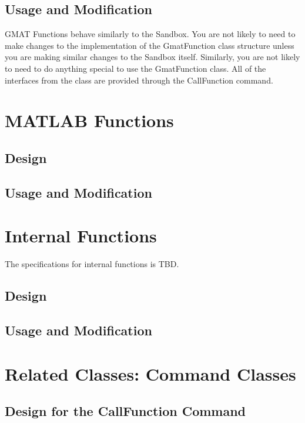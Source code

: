\subsection{Usage and Modification}

GMAT Functions behave similarly to the Sandbox.  You are not likely to need to make changes to the
implementation of the GmatFunction class structure unless you are making similar changes to the
Sandbox itself.  Similarly, you are not likely to need to do anything special to use the
GmatFunction class.  All of the interfaces from the class are provided through the CallFunction
command.

\section{\label{section:MatlabFunctions}MATLAB Functions}

\subsection{Design}

\subsection{\label{section:MatlabFunctionFlow}Usage and Modification}

\section{\label{section:InternalFunctions}Internal Functions}

The specifications for internal functions is TBD.

\subsection{\label{section:InternalFunctionDesign}Design}

\subsection{\label{section:InternalFunctionFlow}Usage and Modification}

\section{Related Classes: Command Classes}

\subsection{\label{section:CallFunctionDesign}Design for the CallFunction Command}



